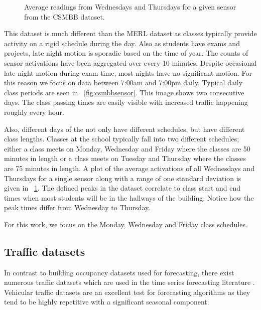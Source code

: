 \begin{figure}[!b]
	\begin{center}
	\end{center}
	\caption{Average readings from Wednesdays and Thursdays for a given sensor from the CSMBB dataset.}
	\label{fig:brown_day_raw}
\end{figure}

This dataset is much different than the MERL dataset as classes typically provide activity on a rigid schedule during the day.  Also as students have exams and projects, late night motion is sporadic based on the time of year.  The counts of sensor activations have been aggregated over every 10 minutes.  Despite occasional late night motion during exam time, most nights have no significant motion.  For this reason we focus on data between 7:00am and 7:00pm daily.  Typical daily class periods are seen in ~\ref{fig:csmbbsensor}.  This image shows two consecutive days.  The class passing times are easily visible with increased traffic happening roughly every hour.

Also, different days of the not only have different schedules, but have different class lengths.  Classes at the school typically fall into two different schedules; either a class meets on Monday, Wednesday and Friday where the classes are 50 minutes in length or a class meets on Tuesday and Thursday where the classes are 75 minutes in length.  A plot of the average activations of all Wednesdays and Thursdays for a single sensor along with a range of one standard deviation is given in ~\ref{fig:brown_day_raw}.  The defined peaks in the dataset correlate to class start and end times when most students will be in the hallways of the building.  Notice how the peak times differ from Wednesday to Thursday. 

For this work, we focus on the Monday, Wednesday and Friday class schedules.


\subsection{Traffic datasets}
In contrast to building occupancy datasets used for forecasting, there exist numerous traffic datasets which are used in the time series forecasting literature \cite{Kamarianakis2003, Smith2002, Williams2003, Zhang2009}.  Vehicular traffic datasets are an excellent test for forecasting algorithms as they tend to be highly repetitive with a significant seasonal component.  

